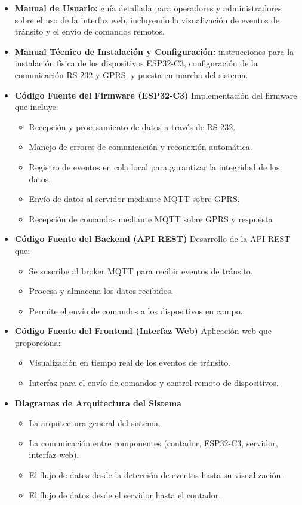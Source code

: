 \documentclass[
11pt, %
]{charter}
\begin{document}
\begin{itemize}
	\item \textbf{Manual de Usuario:} guía detallada para operadores y administradores sobre el uso de la interfaz web, incluyendo la visualización de eventos de tránsito y el envío de comandos remotos.
	\item \textbf{Manual Técnico de Instalación y Configuración:} instrucciones para la instalación física de los dispositivos ESP32-C3, configuración de la comunicación RS-232 y GPRS, y puesta en marcha del sistema.
	\item \textbf{Código Fuente del Firmware (ESP32-C3)}
	Implementación del firmware que incluye:
	\begin{itemize}
	\item Recepción y procesamiento de datos a través de RS-232.
	\item Manejo de errores de comunicación y reconexión automática.
	\item Registro de eventos en cola local para garantizar la integridad de los datos.
	\item Envío de datos al servidor mediante MQTT sobre GPRS.
	\item Recepción de comandos mediante MQTT sobre GPRS y respuesta
	\end{itemize}

\item \textbf{Código Fuente del Backend (API REST)}
Desarrollo de la API REST que:

\begin{itemize}
\item Se suscribe al broker MQTT para recibir eventos de tránsito.
\item Procesa y almacena los datos recibidos.
\item Permite el envío de comandos a los dispositivos en campo. 
\end{itemize}

\item \textbf{Código Fuente del Frontend (Interfaz Web)}
Aplicación web que proporciona:
\begin{itemize}
\item Visualización en tiempo real de los eventos de tránsito.
\item Interfaz para el envío de comandos y control remoto de dispositivos.
\end{itemize}

\item \textbf{Diagramas de Arquitectura del Sistema}
\begin{itemize}
\item La arquitectura general del sistema.
\item La comunicación entre componentes (contador, ESP32-C3, servidor, interfaz web).
\item El flujo de datos desde la detección de eventos hasta su visualización.
\item El flujo de datos desde el servidor hasta el contador.
\end{itemize}


\end{itemize}
\end{document}
